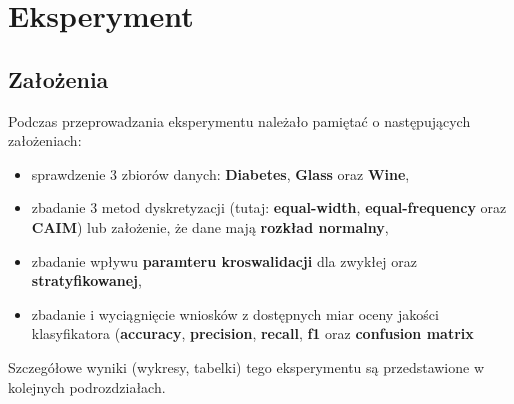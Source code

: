 \section{Eksperyment}
    \subsection{Założenia}
    Podczas przeprowadzania eksperymentu należało pamiętać o następujących założeniach:
    \begin{itemize}
        \item{sprawdzenie 3 zbiorów danych: \textbf{Diabetes}, \textbf{Glass} oraz \textbf{Wine},}
        \item{zbadanie 3 metod dyskretyzacji (tutaj: \textbf{equal-width}, \textbf{equal-frequency}
              oraz \textbf{CAIM}) lub założenie, że dane mają \textbf{rozkład normalny},}
        \item{zbadanie wpływu \textbf{paramteru kroswalidacji} dla zwykłej oraz \textbf{stratyfikowanej},}
        \item{zbadanie i wyciągnięcie wniosków z dostępnych miar oceny jakości klasyfikatora
              (\textbf{accuracy}, \textbf{precision}, \textbf{recall}, \textbf{f1} oraz \textbf{confusion matrix}}
    \end{itemize}
    Szczegółowe wyniki (wykresy, tabelki) tego eksperymentu są przedstawione w kolejnych podrozdziałach.

    
    
